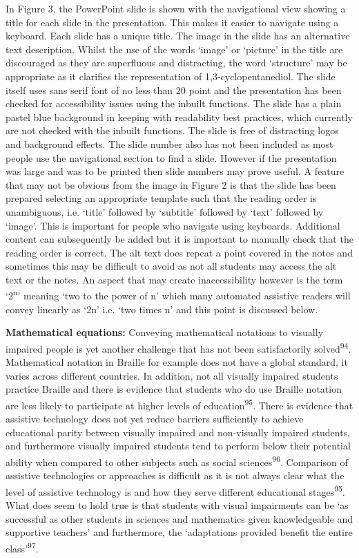 \documentclass[11.5pt]{sig-alternate} %
\begin{document}
\begin{large}
In Figure 3, the PowerPoint slide is shown with the navigational view showing a title for each slide in the presentation. This makes it easier to navigate using a keyboard. Each slide has a unique title. The image in the slide has an alternative text description. Whilst the use of the words ‘image’ or ‘picture’ in the title are discouraged as they are superfluous and distracting, the word ‘structure’ may be appropriate as it clarifies the representation of 1,3-cyclopentanediol. The slide itself uses sans serif font of no less than 20 point and the presentation has been checked for accessibility issues using the inbuilt functions. The slide has a plain pastel blue background in keeping with readability best practices, which currently are not checked with the inbuilt functions. The slide is free of distracting logos and background effects. The slide number also has not been included as most people use the navigational section to find a slide. However if the presentation was large and was to be printed then slide numbers may prove useful. A feature that may not be obvious from the image in Figure 2 is that the slide has been prepared selecting an appropriate template such that the reading order is unambiguous, i.e. ‘title’ followed by ‘subtitle’ followed by ‘text’ followed by ‘image’. This is important for people who navigate using keyboards. Additional content can subsequently be added but it is important to manually check that the reading order is correct. The alt text does repeat a point covered in the notes and sometimes this may be difficult to avoid as not all students may access the alt text or the notes. An aspect that may create inaccessibility however is the term ‘2\textsuperscript{n}’ meaning ‘two to the power of n’ which many automated assistive readers will convey linearly as ‘2n’ i.e. ‘two times n’ and this point is discussed below.

\textbf{Mathematical equations:} Conveying mathematical notations to visually impaired people is yet another challenge that has not been satisfactorily solved\textsuperscript{94}. Mathematical notation in Braille for example does not have a global standard, it varies across different countries.  In addition, not all visually impaired students practice Braille and there is evidence that students who do use Braille notation are less likely to participate at higher levels of education\textsuperscript{95}. There is evidence that assistive technology does not yet reduce barriers sufficiently to achieve educational parity between visually impaired and non-visually impaired students, and furthermore visually impaired students tend to perform below their potential ability when compared to other subjects such as social sciences\textsuperscript{96}. Comparison of assistive technologies or approaches is difficult as it is not always clear what the level of assistive technology is and how they serve different educational stages\textsuperscript{95}. What does seem to hold true is that students with visual impairments can be ‘as successful as other students in sciences and mathematics given knowledgeable and supportive teachers’ and furthermore, the ‘adaptations provided benefit the entire class’\textsuperscript{97}. 


\end{large}
\end{document}
